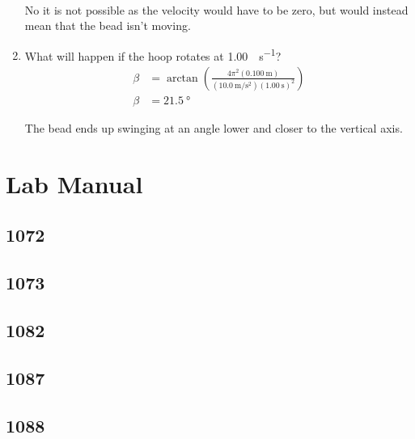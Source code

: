 \documentclass{article}
\begin{document}
\begin{enumerate}[label = \textbf{(\alph*)}]
\begin{align*}
		\end{align*}
		\begin{mdframed}
			No it is not possible as the velocity would have to be zero, but would instead mean that the bead isn't moving.
		\end{mdframed}
	\item What will happen if the hoop rotates at \SI{1.00}{\rev \per \second}?
		\begin{align*}
			\beta & = \arctan \left( \frac{ 4\pi^2(\SI{0.100}{\meter}) }{ (\SI{10.0}{\meter \per \second \squared})(\SI{1.00}{\second})^2 } \right) \\
			\beta & = \SI{21.5}{\degree}
		\end{align*}
		\begin{mdframed}
			The bead ends up swinging at an angle lower and closer to the vertical axis.
		\end{mdframed}
\end{enumerate}

\section{Lab Manual}

\subsection{1072}

\subsection{1073}

\subsection{1082}

\subsection{1087}

\subsection{1088}
\end{document}
